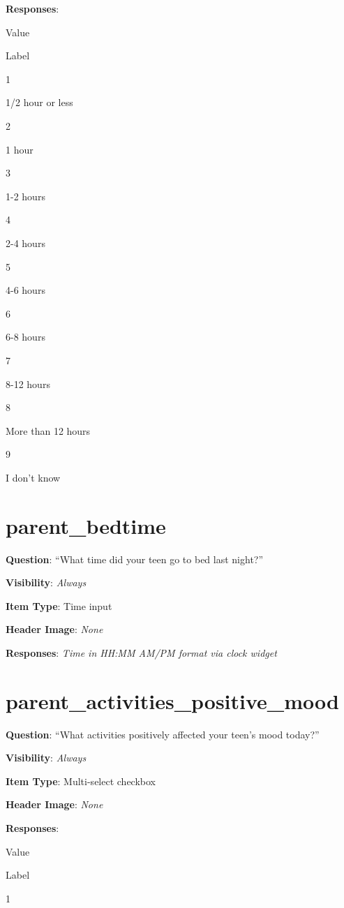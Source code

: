 \documentclass[]{book}
\begin{document}
\textbf{Responses}:

Value

Label

1

1/2 hour or less

2

1 hour

3

1-2 hours

4

2-4 hours

5

4-6 hours

6

6-8 hours

7

8-12 hours

8

More than 12 hours

9

I don't know

\hypertarget{parent_bedtime}{%
\section{parent\_bedtime}\label{parent_bedtime}}

\textbf{Question}: ``What time did your teen go to bed last night?''

\textbf{Visibility}: \emph{Always}

\textbf{Item Type}: Time input

\textbf{Header Image}: \emph{None}

\textbf{Responses}: \emph{Time in HH:MM AM/PM format via clock widget}

\hypertarget{parent_activities_positive_mood}{%
\section{parent\_activities\_positive\_mood}\label{parent_activities_positive_mood}}

\textbf{Question}: ``What activities positively affected your teen's mood today?''

\textbf{Visibility}: \emph{Always}

\textbf{Item Type}: Multi-select checkbox

\textbf{Header Image}: \emph{None}

\textbf{Responses}:

Value

Label

1
\end{document}

